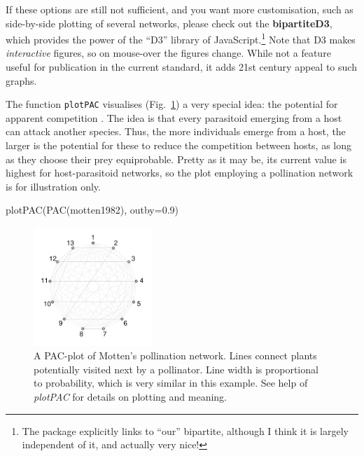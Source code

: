 \documentclass[a4paper, 11pt]{article}\usepackage[]{graphicx}\usepackage[]{color}
\makeatletter
\newcommand{\package}[1]{\textbf{#1}}
\newcommand{\indR}[1]{\texttt{#1}\index{#1@\texttt{#1}}}   %
\makeatother
\begin{document}
If these options are still not sufficient, and you want more customisation, such as side-by-side plotting of several networks, please check out the \package{bipartiteD3}, which provides the power of the ``D3'' library of JavaScript.\footnote{The package explicitly links to ``our'' bipartite, although I think it is largely independent of it, and actually very nice!} Note that D3 makes \emph{interactive} figures, so on mouse-over the figures change. While not a feature useful for publication in the current standard, it adds 21st century appeal to such graphs.

The function \indR{plotPAC} visualises  (Fig.~\ref{fig:AplotPAC}) a very special idea: the potential for apparent competition \citep{Morris2005}. The idea is that every parasitoid emerging from a host can attack another species. Thus, the more individuals emerge from a host, the larger is the potential for these to reduce the competition between hosts, as long as they choose their prey equiprobable. Pretty as it may be, its current value is highest for host-parasitoid networks, so the plot employing a pollination network is for illustration only.
\begin{Schunk}
\begin{Sinput}
plotPAC(PAC(motten1982), outby=0.9)
\end{Sinput}
\end{Schunk}
%
\begin{figure}
  \centering
	\includegraphics[width=0.4\textwidth]{figures/motten1982_PACplot}
	\caption{A PAC-plot of Motten's \citeyear{Motten1982} pollination network. Lines connect plants potentially visited next by a pollinator. Line width is proportional to probability, which is very similar in this example. See help of \emph{plotPAC} for details on plotting and meaning.}
	\label{fig:AplotPAC}
\end{figure}
\end{document}
